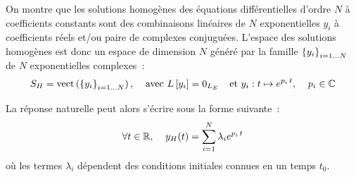 \begin{remark}{}
        
      On montre que les solutions homogènes des équations
      différentielles d'ordre $N$ à coefficients constants sont des
      combinaisons linéaires de $N$ exponentielles $y_i$ à
      coefficients réels et/ou paire de complexes conjuguées. L'espace
      des solutions homogènes est donc un espace de dimension $N$
      généré par la famille $\left\{y_i\right\}_{i=1\dots N}$ de $N$
      exponentielles complexes~:
	\begin{equation}\label{eq:sol_homogene_ordre_n}
          S_H=\mathrm{vect}\left(\left\{y_i\right\}_{i=1\dots N}\right),\;\;\;\; \text{avec } L\left[y_i\right]=\mathrm{0}_{L_E}\;\;\;\;\text{et }y_i : t\mapsto e^{p_i\,t},\;\;\;\; p_i\in\mathbb{C}     
	\end{equation}

        La réponse naturelle peut alors s'écrire sous la forme
        suivante~:
	\begin{equation}\label{eq:reponse_naturelle}
          \forall t\in\mathbb{R},\;\;\;\; y_{H}(t) = \sum_{i=1}^N \lambda_{i} e^{p_i\,t}
	\end{equation}
	où les termes $\lambda_{i}$ dépendent des conditions initiales
        connues en un temps $t_{0}$.	
        

\end{remark}
